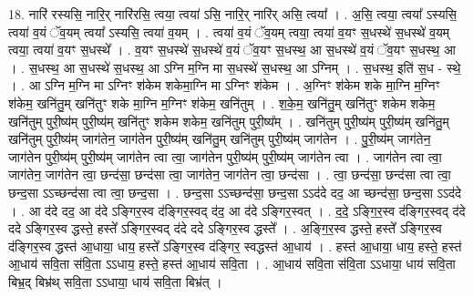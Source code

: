 \documentclass[17pt]{extarticle}
\begin{document}
18. नारि॑ रस्यसि॒ नारि॒र् नारि॑रसि॒ त्वया॒ त्वया॑ ऽसि॒ नारि॒र् नारि॑र् असि॒ त्वया᳚ । . अ॒सि॒ त्वया॒ त्वया᳚ ऽस्यसि॒ त्वया॑ व॒यं ॅव॒यम् त्वया᳚ ऽस्यसि॒ त्वया॑ व॒यम् । . त्वया॑ व॒यं ॅव॒यम् त्वया॒ त्वया॑ व॒यꣳ स॒धस्थे॑ स॒धस्थे॑ व॒यम् त्वया॒ त्वया॑ व॒यꣳ स॒धस्थे᳚ । . व॒यꣳ स॒धस्थे॑ स॒धस्थे॑ व॒यं ॅव॒यꣳ स॒धस्थ॒ आ स॒धस्थे॑ व॒यं ॅव॒यꣳ स॒धस्थ॒ आ । . स॒धस्थ॒ आ स॒धस्थे॑ स॒धस्थ॒ आ ऽग्नि म॒ग्नि मा स॒धस्थे॑ स॒धस्थ॒ आ ऽग्निम् । . स॒धस्थ॒ इति॑ स॒ध - स्थे॒ । . आ ऽग्नि म॒ग्नि मा ऽग्निꣳ श॑केम शकेमा॒ग्नि मा ऽग्निꣳ श॑केम । . अ॒ग्निꣳ श॑केम शके मा॒ग्नि म॒ग्निꣳ श॑केम॒ खनि॑तु॒म् खनि॑तुꣳ शके मा॒ग्नि म॒ग्निꣳ श॑केम॒ खनि॑तुम् । . श॒के॒म॒ खनि॑तु॒म् खनि॑तुꣳ शकेम शकेम॒ खनि॑तुम् पुरी॒ष्य॑म् पुरी॒ष्य॑म् खनि॑तुꣳ शकेम शकेम॒ खनि॑तुम् पुरी॒ष्य᳚म् । . खनि॑तुम् पुरी॒ष्य॑म् पुरी॒ष्य॑म् खनि॑तु॒म् खनि॑तुम् पुरी॒ष्य॑म् जाग॑तेन॒ जाग॑तेन पुरी॒ष्य॑म् खनि॑तु॒म् खनि॑तुम् पुरी॒ष्य॑म् जाग॑तेन । . पु॒री॒ष्य॑म् जाग॑तेन॒ जाग॑तेन पुरी॒ष्य॑म् पुरी॒ष्य॑म् जाग॑तेन त्वा त्वा॒ जाग॑तेन पुरी॒ष्य॑म् पुरी॒ष्य॑म् जाग॑तेन त्वा । . जाग॑तेन त्वा त्वा॒ जाग॑तेन॒ जाग॑तेन त्वा॒ छन्द॑सा॒ छन्द॑सा त्वा॒ जाग॑तेन॒ जाग॑तेन त्वा॒ छन्द॑सा । . त्वा॒ छन्द॑सा॒ छन्द॑सा त्वा त्वा॒ छन्द॒सा ऽऽच्छन्द॑सा त्वा त्वा॒ छन्द॒सा । . छन्द॒सा ऽऽच्छन्द॑सा॒ छन्द॒सा ऽऽद॑दे दद॒ आ च्छन्द॑सा॒ छन्द॒सा ऽऽद॑दे । . आ द॑दे दद॒ आ द॑दे ऽङ्गिर॒स्व द॑ङ्गिर॒स्वद् द॑द॒ आ द॑दे ऽङ्गिर॒स्वत् । . द॒दे॒ ऽङ्गि॒र॒स्व द॑ङ्गिर॒स्वद् द॑दे ददे ऽङ्गिर॒स्व द्धस्ते॒ हस्ते᳚ ऽङ्गिर॒स्वद् द॑दे ददे 
ऽङ्गिर॒स्व द्धस्ते᳚ । . अ॒ङ्गि॒र॒स्व द्धस्ते॒ हस्ते᳚ ऽङ्गिर॒स्व द॑ङ्गिर॒स्व द्धस्त॑ आ॒धाया॒ धाय॒ हस्ते᳚ ऽङ्गिर॒स्व द॑ङ्गिर॒ स्वद्धस्त॑ आ॒धाय॑ । . हस्त॑ आ॒धाया॒ धाय॒ हस्ते॒ हस्त॑ आ॒धाय॑ सवि॒ता स॑वि॒ता ऽऽधाय॒ हस्ते॒ हस्त॑ आ॒धाय॑ सवि॒ता । . आ॒धाय॑ सवि॒ता स॑वि॒ता ऽऽधाया॒ धाय॑ सवि॒ता बिभ्र॒द् बिभ्र॑थ् सवि॒ता ऽऽधाया॒ धाय॑ सवि॒ता बिभ्र॑त् । \newline
\end{document}
